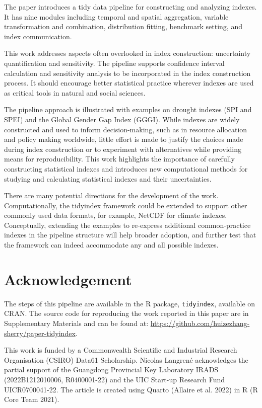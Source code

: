\documentclass[
]{interact}
\begin{document}
The paper introduces a tidy data pipeline for constructing and analyzing
indexes. It has nine modules including temporal and spatial aggregation,
variable transformation and combination, distribution fitting, benchmark
setting, and index communication.

This work addresses aspects often overlooked in index construction:
uncertainty quantification and sensitivity. The pipeline supports
confidence interval calculation and sensitivity analysis to be
incorporated in the index construction process. It should encourage
better statistical practice wherever indexes are used as critical tools
in natural and social sciences.

The pipeline approach is illustrated with examples on drought indexes
(SPI and SPEI) and the Global Gender Gap Index (GGGI). While indexes are
widely constructed and used to inform decision-making, such as in
resource allocation and policy making worldwide, little effort is made
to justify the choices made during index construction or to experiment
with alternatives while providing means for reproducibility. This work
highlights the importance of carefully constructing statistical indexes
and introduces new computational methods for studying and calculating
statistical indexes and their uncertainties.

There are many potential directions for the development of the work.
Computationally, the tidyindex framework could be extended to support
other commonly used data formats, for example, NetCDF for climate
indexes. Conceptually, extending the examples to re-express additional
common-practice indexes in the pipeline structure will help broader
adoption, and further test that the framework can indeed accommodate any
and all possible indexes.

\section{Acknowledgement}\label{acknowledgement}

The steps of this pipeline are available in the R package,
\texttt{tidyindex}, available on CRAN. The source code for reproducing
the work reported in this paper are in Supplementary Materials and can
be found at: \url{https://github.com/huizezhang-sherry/paper-tidyindex}.

This work is funded by a Commonwealth Scientific and Industrial Research
Organisation (CSIRO) Data61 Scholarship. Nicolas Langrené acknowledges
the partial support of the Guangdong Provincial Key Laboratory IRADS
(2022B1212010006, R0400001-22) and the UIC Start-up Research Fund
UICR0700041-22. The article is created using Quarto (Allaire et al.
2022) in R (R Core Team 2021).
\end{document}
